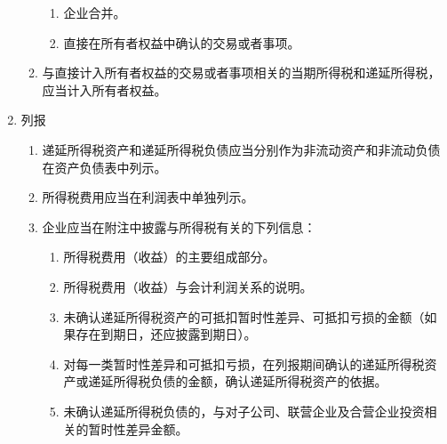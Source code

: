 \begin{appendices}
\begin{enumerate}[itemsep=0pt, leftmargin=1cm, before=\normalfont\small]
\begin{enumerate}[itemsep=0pt, leftmargin=1cm, before=\normalfont\small, start=16]
\begin{enumerate}[itemsep=0pt, leftmargin=1cm, before=\normalfont\small, start=1]
                            \item 企业合并。
                            \item 直接在所有者权益中确认的交易或者事项。
                        \end{enumerate}
                  \item 与直接计入所有者权益的交易或者事项相关的当期所得税和递延所得税，应当计入所有者权益。
              \end{enumerate}
        \item 列报
              \begin{enumerate}[itemsep=0pt, leftmargin=1cm, before=\normalfont\small, start=23] %
                  \item 递延所得税资产和递延所得税负债应当分别作为非流动资产和非流动负债在资产负债表中列示。
                  \item 所得税费用应当在利润表中单独列示。
                  \item 企业应当在附注中披露与所得税有关的下列信息：
                        \begin{enumerate}[itemsep=0pt, leftmargin=1cm, before=\normalfont\small, start=1] %
                            \item 所得税费用（收益）的主要组成部分。
                            \item 所得税费用（收益）与会计利润关系的说明。
                            \item 未确认递延所得税资产的可抵扣暂时性差异、可抵扣亏损的金额（如果存在到期日，还应披露到期日）。
                            \item 对每一类暂时性差异和可抵扣亏损，在列报期间确认的递延所得税资产或递延所得税负债的金额，确认递延所得税资产的依据。
                            \item 未确认递延所得税负债的，与对子公司、联营企业及合营企业投资相关的暂时性差异金额。
                        \end{enumerate}
              \end{enumerate}
    \end{enumerate}
\end{appendices}
